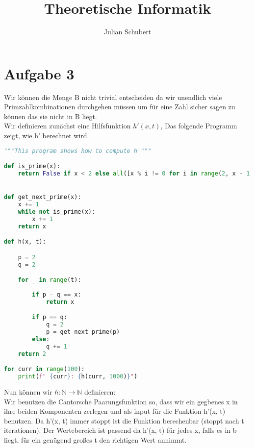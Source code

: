 \documentclass[14pt]{article}
\title{Theoretische Informatik}
\author{Julian Schubert}
\begin{document}
\section*{Aufgabe 3}
Wir können die Menge B nicht trivial entscheiden da wir unendlich viele
Primzahlkombinationen durchgehen müssen um für eine Zahl sicher sagen zu
können das sie nicht in B liegt. \\
Wir definieren zunächst eine Hilfsfunktion $h'(x, t)$,
Das folgende Programm zeigt, wie h' berechnet wird.
\begin{lstlisting}[language=Python]
    """This program shows how to compute h'"""

def is_prime(x):
    return False if x < 2 else all([x % i != 0 for i in range(2, x - 1)])


def get_next_prime(x):
    x += 1
    while not is_prime(x):
        x += 1
    return x

def h(x, t):

    p = 2 
    q = 2

    for _ in range(t):
            
        if p - q == x:
            return x

        if p == q:
            q = 2
            p = get_next_prime(p)
        else:
            q += 1
    return 2

for curr in range(100):
    print(f" {curr}: {h(curr, 1000)}")
\end{lstlisting}
Nun können wir $h: \mathbb{N} \rightarrow \mathbb{N}$ definieren: \\
Wir benutzen die Cantorsche Paarungsfunktion so, dass wir ein gegbenes 
x in ihre beiden Komponenten zerlegen und als input für die Funktion h'(x, t)
benutzen. Da h'(x, t) immer stoppt ist die Funktion berechenbar (stoppt nach t
iterationen). Der Wertebereich ist passend da h'(x, t) für jedes x, falls es in b liegt,
für ein genügend großes t den richtigen Wert annimmt.
\end{document}
